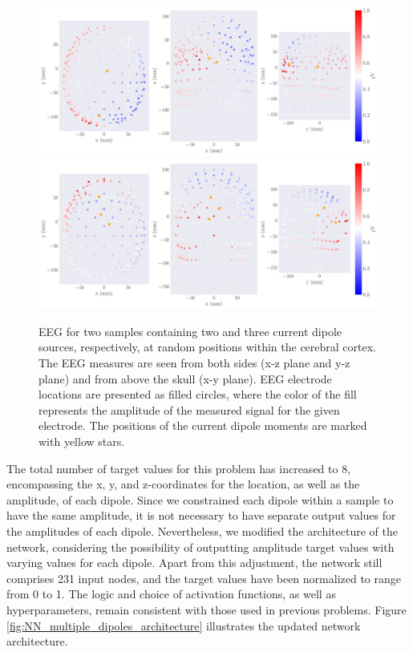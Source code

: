 \documentclass[a4paper, UKenglish, 11pt]{uiomaster}
\begin{document}
\begin{figure}[!htb]
\centering
\includegraphics[width=\linewidth]{figures/dipoles_w_amplitudes_eeg_field_2_3.pdf}
\includegraphics[width=\linewidth]{figures/dipoles_w_amplitudes_eeg_field_3_1.pdf}
\caption{EEG for two samples containing two and three current dipole sources, respectively, at random positions within the cerebral cortex. The EEG measures are seen from both sides (x-z plane and y-z plane) and from above the skull (x-y plane). EEG electrode locations are presented as filled circles, where the color of the fill represents the amplitude of the measured signal for the given electrode. The positions of the current dipole moments are marked with yellow stars.}
\label{fig:multiple_dipoles_data}
\end{figure}

The total number of target values for this problem has increased to 8, encompassing the x, y, and z-coordinates for the location, as well as the amplitude, of each dipole. Since we constrained each dipole within a sample to have the same amplitude, it is not necessary to have separate output values for the amplitudes of each dipole. Nevertheless, we modified the architecture of the network, considering the possibility of outputting amplitude target values with varying values for each dipole. Apart from this adjustment, the network still comprises 231 input nodes, and the target values have been normalized to range from 0 to 1. The logic and choice of activation functions, as well as hyperparameters, remain consistent with those used in previous problems. Figure \ref{fig:NN_multiple_dipoles_architecture} illustrates the updated network architecture.
\end{document}
